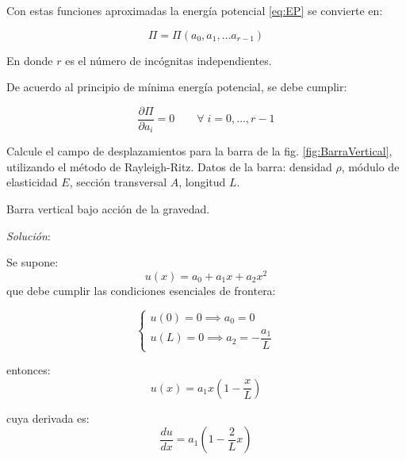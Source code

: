 Con estas funciones aproximadas la energía potencial \eqref{eq:EP} se convierte en:

\begin{equation}
	\Pi = \Pi(a_0, a_1, \dots a_{r-1})
\end{equation}

En donde $r$ es el número de incógnitas independientes.

De acuerdo al principio de mínima energía potencial, se debe cumplir:

\begin{equation}
	\dfrac{\partial \Pi}{\partial a_i} = 0 \qquad \forall \; i = 0, \dots, r - 1
\end{equation}

\begin{example}
	Calcule el campo de desplazamientos para la barra de la fig. \ref{fig:BarraVertical}, utilizando el método de Rayleigh-Ritz. Datos de la barra: densidad $\rho$, módulo de elasticidad $E$, sección transversal $A$, longitud $L$.
	
	
	\begin{marginfigure}[-1cm]
		\centering
		
		\caption{Barra vertical bajo acción de la gravedad.}
		\label{fig:BarraVertical}
	\end{marginfigure}
	
	\textit{Solución}:
	\vspace{2mm}
	
	Se supone:
	\begin{equation}
		u(x) = a_0 + a_1 x + a_2 x^2
	\end{equation}
	que debe cumplir las condiciones esenciales de frontera:
	
	\begin{equation}
		\begin{cases}
			u(0) = 0 \implies a_0 = 0 \\
			u(L) = 0 \implies a_2 = -\dfrac{a_1}{L}
		\end{cases}
	\end{equation}
	
	entonces:
	\begin{equation}
		u(x) = a_1 x \left(1 - \dfrac{x}{L}\right)
		\label{eq:rr1}
	\end{equation}
	
	cuya derivada es:
	\begin{equation}
		\dfrac{du}{dx} = a_1 \left( 1 - \dfrac{2}{L}x \right)
		\label{eq:der1}
	\end{equation}
	

\end{example}

